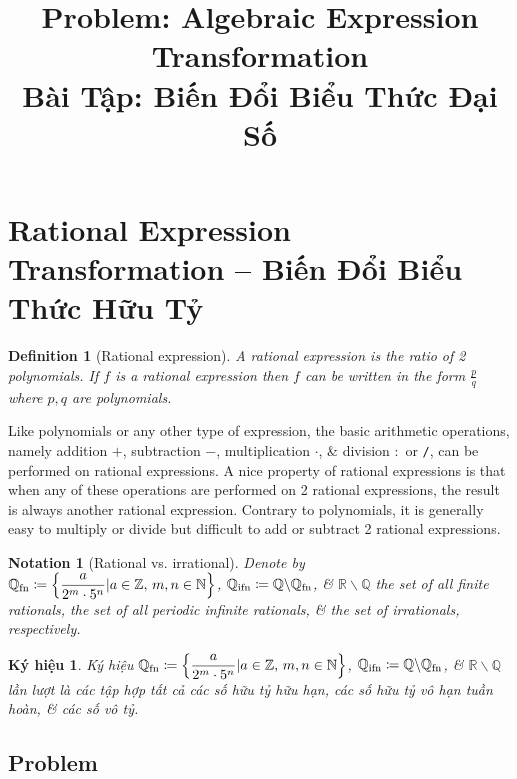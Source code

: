 \documentclass{article}
\title{Problem: Algebraic Expression Transformation\\Bài Tập: Biến Đổi Biểu Thức Đại Số}
\date{}
\newtheorem{definition}{Definition}
\newtheorem{kyhieu}{Ký hiệu}
\newtheorem{notation}{Notation}
\begin{document}
\maketitle
\vspace{-2cm}


\section{Rational Expression Transformation -- Biến Đổi Biểu Thức Hữu Tỷ}

\begin{definition}[Rational expression]
	A {\rm rational expression} is the ratio of 2 polynomials. If $f$ is a rational expression then $f$ can be written in the form $\frac{p}{q}$ where $p,q$ are polynomials.
\end{definition}
Like polynomials or any other type of expression, the basic arithmetic operations, namely addition $+$, subtraction $-$, multiplication $\cdot$, \& division $:$ or {\tt/}, can be performed on rational expressions. A nice property of rational expressions is that when any of these operations are performed on 2 rational expressions, the result is always another rational expression. Contrary to polynomials, it is generally easy to multiply or divide but difficult to add or subtract 2 rational expressions.

\begin{notation}[Rational vs. irrational]
	Denote by $\mathbb{Q}_{\rm fn}\coloneqq\left\{\dfrac{a}{2^m\cdot5^n}|a\in\mathbb{Z},\,m,n\in\mathbb{N}\right\}$, $\mathbb{Q}_{\rm ifn}\coloneqq\mathbb{Q}\backslash\mathbb{Q}_{\rm fn}$, \& $\mathbb{R}\backslash\mathbb{Q}$ the set of all finite rationals, the set of all periodic infinite rationals, \& the set of irrationals, respectively.
\end{notation}

\begin{kyhieu}
	Ký hiệu $\mathbb{Q}_{\rm fn}\coloneqq\left\{\dfrac{a}{2^m\cdot5^n}|a\in\mathbb{Z},\,m,n\in\mathbb{N}\right\}$, $\mathbb{Q}_{\rm ifn}\coloneqq\mathbb{Q}\backslash\mathbb{Q}_{\rm fn}$, \& $\mathbb{R}\backslash\mathbb{Q}$ lần lượt là các tập hợp tất cả các số hữu tỷ hữu hạn, các số hữu tỷ vô hạn tuần hoàn, \& các số vô tỷ.
\end{kyhieu}

\subsection{Problem}
\end{document}
